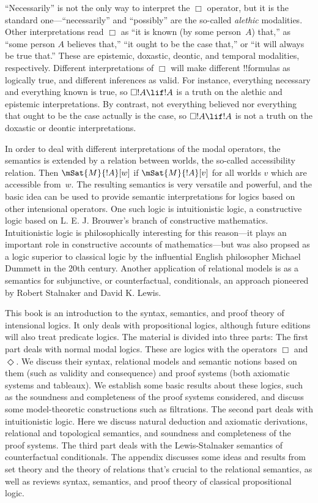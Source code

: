 ``Necessarily'' is not the only way to interpret the $\Box$ operator,
but it is the standard one---``necessarily'' and ``possibly'' are the
so-called \emph{alethic} modalities. Other interpretations read $\Box$
as ``it is known (by some person~$A$) that,'' as ``some person $A$
believes that,'' ``it ought to be the case that,'' or ``it will always
be true that.'' These are epistemic, doxastic, deontic, and temporal
modalities, respectively. Different interpretations of $\Box$ will
make different !!{formula}s as logically true, and different
inferences as valid. For instance, everything necessary and everything
known is true, so $\Box !A \lif !A$ is a truth on the alethic and
epistemic interpretations. By contrast, not everything believed nor
everything that ought to be the case actually is the case, so $\Box !A
\lif !A$ is not a truth on the doxastic or deontic interpretations. 

In order to deal with different interpretations of the modal
operators, the semantics is extended by a relation between worlds, the
so-called accessibility relation.  Then $\mSat{M}{!A}[w]$ if
$\mSat{M}{!A}[v]$ for all worlds $v$ which are accessible from~$w$.
The resulting semantics is very versatile and powerful, and the basic
idea can be used to provide semantic interpretations for logics based
on other intensional operators. One such logic is intuitionistic
logic, a constructive logic based on L. E. J. Brouwer's branch of
constructive mathematics. Intuitionistic logic is philosophically
interesting for this reason---it plays an important role in
constructive accounts of mathematics---but was also propsed as a logic
superior to classical logic by the influential English philosopher
Michael Dummett in the 20th century. Another application of relational
models is as a semantics for subjunctive, or counterfactual,
conditionals, an approach pioneered by Robert Stalnaker and David K.
Lewis.

This book is an introduction to the syntax, semantics, and proof
theory of intensional logics. It only deals with propositional logics,
although future editions will also treat predicate logics.  The
material is divided into three parts: The first part deals with normal
modal logics. These are logics with the operators $\Box$ and
$\Diamond$. We discuss their syntax, relational models and semantic
notions based on them (such as validity and consequence) and proof
systems (both axiomatic systems and tableaux). We establish some
basic results about these logics, such as the soundness and
completeness of the proof systems considered, and discuss some
model-theoretic constructions such as filtrations. The second part
deals with intuitionistic logic. Here we discuss natural deduction and
axiomatic derivations, relational and topological semantics, and
soundness and completeness of the proof systems. The third part deals
with the Lewis-Stalnaker semantics of counterfactual conditionals. 
The appendix discusses some ideas and results from set theory
and the theory of relations that's crucial to the relational
semantics, as well as reviews syntax, semantics, and proof theory of
classical propositional logic.